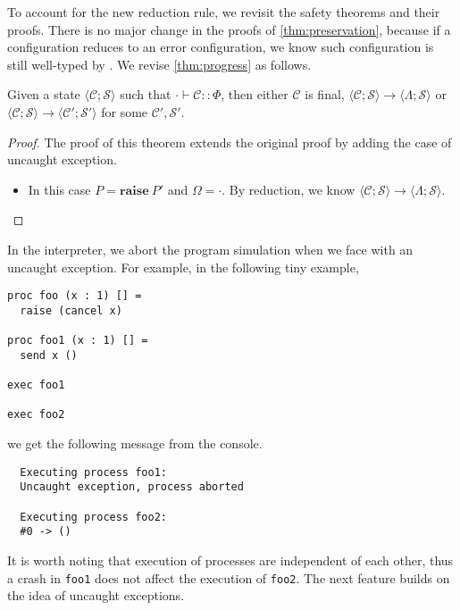 \documentclass[12pt, openany]{memoir}
\newcommand*{\craise}[1]{\textbf{raise}\ #1}
\newcommand*{\config}[0]{\mathcal{C}}
\newcommand*{\cancelSet}[0]{\mathcal{S}}
\begin{document}
To account for the new reduction rule, we revisit the safety theorems and their proofs.
There is no major change in the proofs of \cref{thm:preservation}, because if a configuration reduces to an error configuration,
we know such configuration is still well-typed by . We revise \cref{thm:progress} as follows.
\begin{theorem}
  Given a state $\langle \config; \cancelSet \rangle$ such that $\cdot \vdash \config :: \Phi$, then either
  $\config$ is final, $\langle \config; \cancelSet \rangle \longrightarrow \langle \Lambda; \cancelSet \rangle$ or $\langle \config; \cancelSet \rangle \longrightarrow \langle \config'; \cancelSet' \rangle$ for some $\config', \cancelSet'$.
\end{theorem}
\begin{proof}
  The proof of this theorem extends the original proof by adding the case of uncaught exception.
  \begin{itemize}
    \item [\ruleref{raise'}] In this case $P = \craise{P'}$ and $\Omega = \cdot$.
    By reduction, we know $\langle \config; \cancelSet \rangle \longrightarrow \langle \Lambda; \cancelSet \rangle$.
  \end{itemize}
\end{proof}

In the interpreter, we abort the program simulation when we face with an uncaught exception. For example, in the following tiny example,
\begin{lstlisting}
proc foo (x : 1) [] = 
  raise (cancel x)

proc foo1 (x : 1) [] =
  send x ()

exec foo1

exec foo2
\end{lstlisting}
we get the following message from the console.
\begin{verbatim}
  Executing process foo1:
  Uncaught exception, process aborted

  Executing process foo2:
  #0 -> ()
\end{verbatim}
It is worth noting that execution of processes are independent of each other, thus a crash in \texttt{foo1} does not affect 
the execution of \texttt{foo2}. The next feature builds on the idea of uncaught exceptions.
\end{document}
